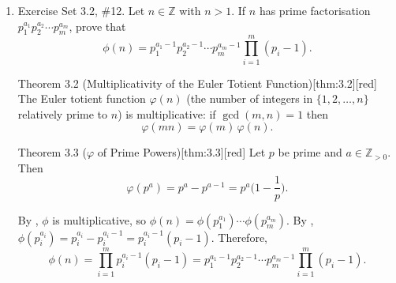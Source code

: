 \begin{enumerate}
\begin{enumerate}
\begin{define}{Theorem 3.1 (Multiplicative Functions and Divisor Sums)}[thm:3.1][red]
    Let $f$ be an arithmetic function and define, for $n\in\mathbb{Z}_{>0}$,
    \[
    F(n):=\sum_{d\mid n} f(d).
    \]
    where $\sum_{d\mid n} f(d)$ is the sum of $f(d)$ over all  divisors $d$ of $n$ (i.e., $\sum_{d\mid 12} f(d)=f(1)+f(2)+f(3)+f(4)+f(6)+f(12)$).
    If $f$ is multiplicative, then $F$ is multiplicative.
    \end{define}
    \begin{subprove}
      Since $\lambda$ is completely multiplicative by part (a), by , $F$ is multiplicative.
      It suffices to evaluate $F$ at prime powers.
      
      For $p$ prime and $a \geq 1$, the divisors of $p^a$ are $1, p, p^2, \ldots, p^a$.
      By , $\lambda(p^k) = (-1)^k$ for $k \geq 0$.
      Thus $F(p^a) = \sum_{k=0}^a \lambda(p^k) = \sum_{k=0}^a (-1)^k$.
      
      If $a$ is even, then $F(p^a) = 1 + (-1) + 1 + \cdots + 1 = 1$.
      If $a$ is odd, then $F(p^a) = 1 + (-1) + 1 + \cdots + (-1) = 0$.
      
      For $n = p_1^{a_1} \cdots p_m^{a_m}$, since $F$ is multiplicative,
      $F(n) = F(p_1^{a_1}) \cdots F(p_m^{a_m})$.
      This equals $1$ if all $a_i$ are even (i.e., $n$ is a perfect square), and $0$ otherwise.
    \end{subprove}
  \end{enumerate}

  \newpage

  \item Exercise Set 3.2, \#12. Let $n \in \mathbb{Z}$ with $n>1$. If $n$ has prime 
  factorisation $p_1^{a_1} p_2^{a_2} \cdots p_m^{a_m}$, prove that
  $$
  \phi(n)=p_1^{a_1-1} p_2^{a_2-1} \cdots p_m^{a_m-1} \prod_{i=1}^m\left(p_i-1\right) .
  $$ 
  \label{prob:3.2.12}
  \begin{define}{Theorem 3.2 (Multiplicativity of the Euler Totient Function)}[thm:3.2][red]
  The Euler totient function $\varphi(n)$ (the number of integers in $\{1,2,\dots,n\}$ relatively prime to $n$) is multiplicative: if $\gcd(m,n)=1$ then
  \[
  \varphi(mn)=\varphi(m)\,\varphi(n).
  \]
  \end{define}
  \begin{define}{Theorem 3.3 ($\varphi$ of Prime Powers)}[thm:3.3][red]
  Let $p$ be prime and $a\in\mathbb{Z}_{>0}$. Then
  \[
  \varphi(p^a)=p^a-p^{a-1}=p^a\Big(1-\frac{1}{p}\Big).
  \]
  \end{define}
  \begin{subprove}
    By , $\phi$ is multiplicative, so $\phi(n) = \phi(p_1^{a_1}) \cdots \phi(p_m^{a_m})$.
    By , $\phi(p_i^{a_i}) = p_i^{a_i} - p_i^{a_i-1} = p_i^{a_i-1}(p_i - 1)$.
    Therefore,
    \[
    \phi(n) = \prod_{i=1}^m p_i^{a_i-1}(p_i - 1) = p_1^{a_1-1} p_2^{a_2-1} \cdots p_m^{a_m-1} \prod_{i=1}^m (p_i - 1).
    \]
  \end{subprove}


\end{enumerate}
